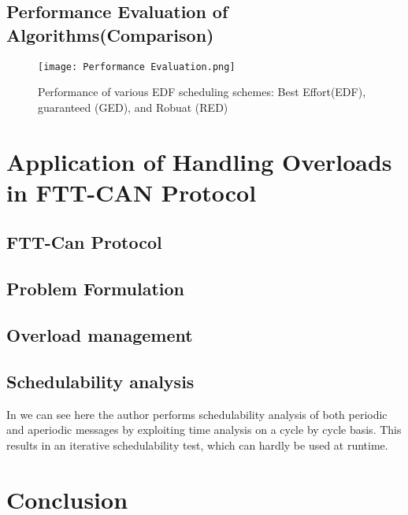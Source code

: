 \documentclass[conference]{IEEEtran}
\begin{document}
\subsection{Performance Evaluation of Algorithms(Comparison)}
\begin{figure}[htp]
    \centering
    \texttt{[image: Performance Evaluation.png]}
    \cite{buttazzo2011hard}
    \caption{Performance of various EDF scheduling schemes: Best Effort(EDF), guaranteed (GED), and Robuat (RED)}
    \label{fig:reg-gen}
\end{figure}


\section{Application of Handling Overloads in FTT-CAN Protocol}
\subsection{FTT-Can Protocol}
\subsection{Problem Formulation}
\subsection{Overload management}
\subsection{Schedulability analysis}
In \cite{inproceedings} we can see here the author performs schedulability analysis of both periodic and aperiodic messages by exploiting time analysis on a cycle by cycle basis. This results in an iterative schedulability test, which can hardly be used at runtime. 
\section{Conclusion}





\end{document}
